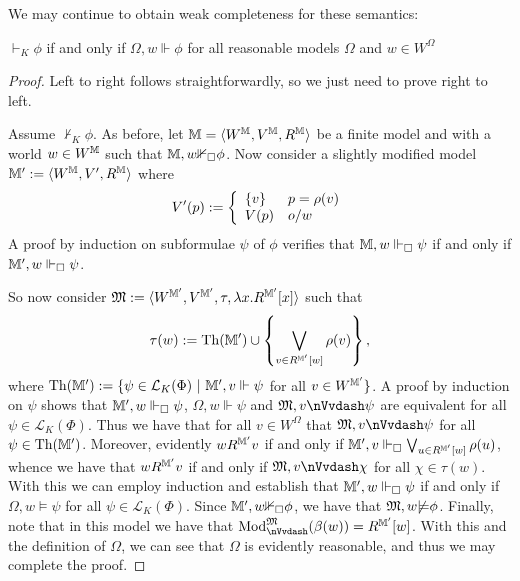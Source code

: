 We may continue to obtain weak completeness for these semantics:

\begin{proposition}
  $\vdash_K \phi$ if and only if $\Omega, w \Vdash \phi$ for all reasonable
  models $\Omega$ and $w \in W^{\Omega}$
\end{proposition}

\begin{proof}
  Left to right follows straightforwardly, so we just need to prove right to
  left.
  
  Assume $\nvdash_K \phi$. As before, let $\mathbbm{M} = \langle
  W^{\mathbbm{M}}, V^{\mathbbm{M}}, R^{\mathbbm{M}} \rangle$ be a finite model
  and with a world $w \in W^{\mathbbm{M}}$ such that $\mathbbm{M}, w
  {\nVdash}_{\Box} \phi$.   Now consider a slightly modified model
  $\mathbbm{M}' \assign \langle W^{\mathbbm{M}}, V', R^{\mathbbm{M}} \rangle$
  where
  \[ V' (p) \assign \left\{ \begin{array}{ll}
       \{v\} & p = \rho (v)\\
       V (p) & o / w
     \end{array} \right.  \]
  A proof by induction on subformulae $\psi$ of $\phi$ verifies that
  $\mathbbm{M}, w \Vdash_{\Box} \psi$ if and only if $\mathbbm{M}', w
  \Vdash_{\Box} \psi$.
  
  So now consider $\Omega \assign \langle W^{\mathbbm{M}'}, V^{\mathbbm{M}'},
  \tau, \lambda x.R^{\mathbbm{M}'} [x] \rangle$ such that
  \[ \tau (w) \assign \tmop{Th} (\mathbbm{M}') \cup \left\{ \bigvee_{v \in
     R^{\mathbbm{M}'} [w]} \rho (v) \right\}, \]
  where $\tmop{Th} (\mathbbm{M}') \assign \{\psi \in \mathcal{L}_K
  (\Phi) \  | \  \mathbbm{M}', v \Vdash \psi$ for all $v
  \in W^{\mathbbm{M}'} \}$.   A proof by induction on $\psi$ shows that
  $\mathbbm{M}', w \Vdash_{\Box} \psi$, $\Omega, w \Vdash \psi$ and $\Omega, v
  {\nVvdash} \psi$ are equivalent for all $\psi \in \mathcal{L}_K (\Phi)$.  
  Thus we have that for all $v \in W^{\Omega}$ that $\Omega, v {\nVvdash}
  \psi$ for all $\psi \in \tmop{Th} (\mathbbm{M}')$.   Moreover, evidently $w
  R^{\mathbbm{M}'} v$ if and only if $\mathbbm{M}', v \Vdash_{\Box} \bigvee_{u
  \in R^{\mathbbm{M}'} [w]} \rho (u)$, whence we have that $w R^{\mathbbm{M}'}
  v$ if and only if $\Omega, v {\nVvdash} \chi$ for all $\chi \in \tau
  (w)$. With this we can employ induction and establish that $\mathbbm{M}', w
  \Vdash_{\Box} \psi$ if and only if $\Omega, w \models \psi$ for all $\psi
  \in \mathcal{L}_K (\Phi)$.   Since $\mathbbm{M}', w {\nVdash}_{\Box} \phi$,
  we have that $\Omega, w {\nmodels} \phi$.   Finally, note that in this
  model we have that $\tmop{Mod}^{\Omega}_{{\nVvdash}} (\beta (w)) =
  R^{\mathbbm{M}'} [w]$. With this and the definition of $\Omega$, we can see
  that $\Omega$ is evidently reasonable, and thus we may complete the proof.

\end{proof}

